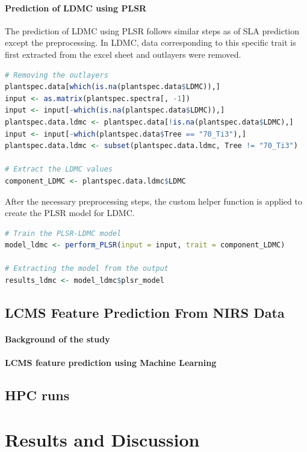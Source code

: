 \documentclass[12pt,a4paper]{report}
\begin{document}
\subsubsection*{Prediction of LDMC using PLSR}
The prediction of LDMC using PLSR follows similar steps as of SLA prediction except the preprocessing. In LDMC, data corresponding to this specific trait is first extracted from the excel sheet and outlayers were removed.

\begin{lstlisting}[language=R, style=mystyle]
# Removing the outlayers
plantspec.data[which(is.na(plantspec.data$LDMC)),]
input <- as.matrix(plantspec.spectra[, -1])
input <- input[-which(is.na(plantspec.data$LDMC)),]
plantspec.data.ldmc <- plantspec.data[!is.na(plantspec.data$LDMC),]
input <- input[-which(plantspec.data$Tree == "70_Ti3"),]
plantspec.data.ldmc <- subset(plantspec.data.ldmc, Tree != "70_Ti3")

# Extract the LDMC values
component_LDMC <- plantspec.data.ldmc$LDMC
\end{lstlisting}

After the necessary preprocessing steps, the custom helper function is applied to create the PLSR model for LDMC.

\begin{lstlisting}[language=R, style=mystyle]
# Train the PLSR-LDMC model
model_ldmc <- perform_PLSR(input = input, trait = component_LDMC)

# Extracting the model from the output
results_ldmc <- model_ldmc$plsr_model
\end{lstlisting}



\section{LCMS Feature Prediction From NIRS Data}
\subsubsection*{Background of the study}
\subsubsection*{LCMS feature prediction using Machine Learning}
\section{HPC runs}


\chapter{Results and Discussion}
\end{document}
